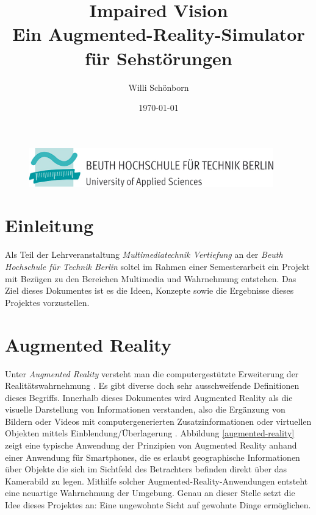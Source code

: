 \documentclass[a4paper]{article}
\title{Impaired Vision \\ Ein Augmented-Reality-Simulator für Sehstörungen}
\author{Willi Schönborn}
\date{\today}
\begin{document}
\begin{figure}[H]
\centering
\includegraphics{beuth.png}
\maketitle
\end{figure}

\section*{Einleitung}
Als Teil der Lehrveranstaltung \textit{Multimediatechnik Vertiefung} an der \textit{Beuth Hochschule für Technik Berlin} soltel im Rahmen einer Semesterarbeit ein Projekt mit Bezügen zu den Bereichen Multimedia und Wahrnehmung entstehen. Das Ziel dieses Dokumentes ist es die Ideen, Konzepte sowie die Ergebnisse dieses Projektes vorzustellen.

\section*{Augmented Reality}
Unter \textit{Augmented Reality} versteht man die computergestützte Erweiterung der Realitätswahrnehmung \cite{WP-AR}. Es gibt diverse doch sehr ausschweifende Definitionen dieses Begriffs. Innerhalb dieses Dokumentes wird Augmented Reality als die visuelle Darstellung von Informationen verstanden, also die Ergänzung von Bildern oder Videos mit computergenerierten Zusatzinformationen oder virtuellen Objekten mittels Einblendung/Überlagerung \cite{WP-AR}. Abbildung \ref{augmented-reality} zeigt eine typische Anwendung der Prinzipien von Augmented Reality anhand einer Anwendung für Smartphones, die es erlaubt geographische Informationen über Objekte die sich im Sichtfeld des Betrachters befinden direkt über das Kamerabild zu legen. Mithilfe solcher Augmented-Reality-Anwendungen entsteht eine neuartige Wahrnehmung der Umgebung. Genau an dieser Stelle setzt die Idee dieses Projektes an: Eine ungewohnte Sicht auf gewohnte Dinge ermöglichen.
\end{document}
